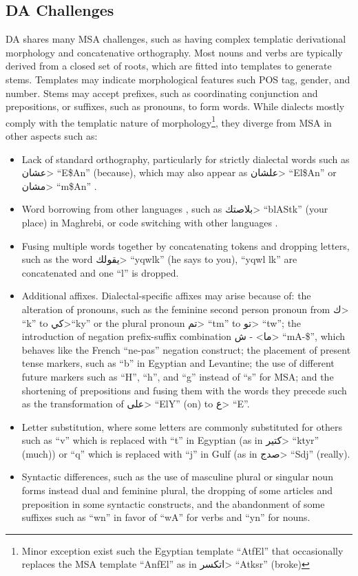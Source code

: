 \documentclass[11pt,letterpaper]{article}
\begin{document}
\subsection{DA Challenges}
DA shares many MSA challenges, such as having complex templatic derivational morphology and concatenative orthography. Most  nouns and verbs are typically derived from a closed set of roots, which are fitted into templates to generate stems. Templates may indicate morphological features such POS tag, gender, and number. Stems may accept prefixes, such as coordinating conjunction and prepositions, or suffixes, such as pronouns, to form words. While dialects mostly comply with the templatic nature of morphology\footnote{Minor exception exist such the Egyptian template ``AtfEl'' that occasionally replaces the MSA template ``AnfEl'' as in \<اتكسر> ``Atksr'' (broke)}, they diverge from MSA in other aspects such as:
\begin{itemize}[leftmargin=*]
\setlength\itemsep{-0.3em}
\item Lack of standard orthography, particularly for strictly dialectal words such as \<عشان> ``E\$An'' (because), which may also appear as \<علشان> ``El\$An'' or \<مشان> ``m\$An'' \cite{habash2012conventional}. \item Word borrowing from other languages \cite{ibrahim2006borrowing}, such as \<بلاصتك> ``blAStk'' (your place) in Maghrebi, or code switching with other languages \cite{samih45676WSCS}.
\item Fusing multiple words together by concatenating tokens and dropping letters, such as the word \<يقولك> ``yqwlk'' (he says to you), ``yqwl lk'' are concatenated and one ``l'' is dropped.
\item Additional affixes.  Dialectal-specific affixes may arise because of: the alteration of pronouns, such as the feminine second person pronoun from \<ك> ``k'' to \<كي>``ky'' or the plural pronoun \<تم> ``tm'' to \<تو> ``tw''; the introduction of negation prefix-suffix combination \<ما> - \<ش> ``mA-\$'', which behaves like the French ``ne-pas'' negation construct; the placement of present tense markers, such as ``b'' in Egyptian and Levantine; the use of different future markers such as ``H'', ``h'', and ``g'' instead of ``s'' for MSA; and the shortening of prepositions and fusing them with the words they precede such as the transformation of \<على> ``ElY'' (on) to \<ع> ``E''.
\item Letter substitution, where some letters are commonly substituted for others such as ``v'' which is replaced with ``t'' in Egyptian (as in \<كتير> ``ktyr'' (much)) or ``q'' which is replaced with ``j'' in Gulf (as in \<صدج> ``Sdj'' (really).  \item Syntactic differences, such as the use of masculine plural or singular noun forms instead dual and feminine plural, the dropping of some articles and preposition in some syntactic constructs, and the abandonment of some suffixes such as ``wn'' in favor of ``wA'' for verbs and ``yn'' for nouns.
\end{itemize}
\end{document}
